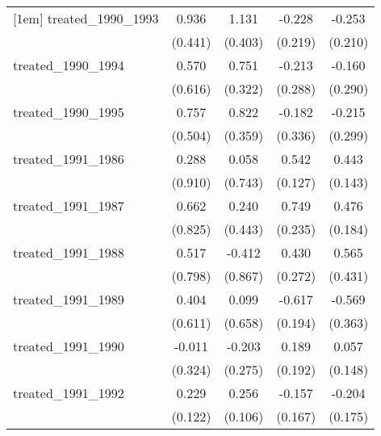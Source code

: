 {\begin{tabular}{l*{4}{c}}
[1em]
treated\_1990\_1993&       0.936\sym{*}  &       1.131\sym{**} &      -0.228         &      -0.253         \\
            &     (0.441)         &     (0.403)         &     (0.219)         &     (0.210)         \\
[1em]
treated\_1990\_1994&       0.570         &       0.751\sym{*}  &      -0.213         &      -0.160         \\
            &     (0.616)         &     (0.322)         &     (0.288)         &     (0.290)         \\
[1em]
treated\_1990\_1995&       0.757         &       0.822\sym{*}  &      -0.182         &      -0.215         \\
            &     (0.504)         &     (0.359)         &     (0.336)         &     (0.299)         \\
[1em]
treated\_1991\_1986&       0.288         &       0.058         &       0.542\sym{***}&       0.443\sym{**} \\
            &     (0.910)         &     (0.743)         &     (0.127)         &     (0.143)         \\
[1em]
treated\_1991\_1987&       0.662         &       0.240         &       0.749\sym{**} &       0.476\sym{**} \\
            &     (0.825)         &     (0.443)         &     (0.235)         &     (0.184)         \\
[1em]
treated\_1991\_1988&       0.517         &      -0.412         &       0.430         &       0.565         \\
            &     (0.798)         &     (0.867)         &     (0.272)         &     (0.431)         \\
[1em]
treated\_1991\_1989&       0.404         &       0.099         &      -0.617\sym{**} &      -0.569         \\
            &     (0.611)         &     (0.658)         &     (0.194)         &     (0.363)         \\
[1em]
treated\_1991\_1990&      -0.011         &      -0.203         &       0.189         &       0.057         \\
            &     (0.324)         &     (0.275)         &     (0.192)         &     (0.148)         \\
[1em]
treated\_1991\_1992&       0.229         &       0.256\sym{*}  &      -0.157         &      -0.204         \\
            &     (0.122)         &     (0.106)         &     (0.167)         &     (0.175)         \\

\end{tabular}}
